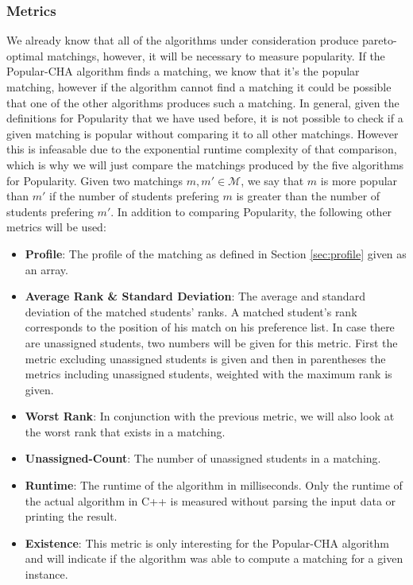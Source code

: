 \subsubsection{Metrics}
We already know that all of the algorithms under consideration produce pareto-optimal matchings, however, it will be necessary to measure popularity. If the Popular-CHA algorithm finds a matching, we know that it's the popular matching, however if the algorithm cannot find a matching it could be possible that one of the other algorithms produces such a matching. In general, given the definitions for Popularity that we have used before, it is not possible to check if a given matching is popular without comparing it to all other matchings. However this is infeasable due to the exponential runtime complexity of that comparison, which is why we will just compare the matchings produced by the five algorithms for Popularity. Given two matchings $m, m' \in \mathcal{M}$, we say that $m$ is more popular than $m'$ if the number of students prefering $m$ is greater than the number of students prefering $m'$. 
In addition to comparing Popularity, the following other metrics will be used:
\begin{itemize}
  \item \textbf{Profile}: The profile of the matching as defined in Section \ref{sec:profile} given as an array.
  \item \textbf{Average Rank \& Standard Deviation}: The average and standard deviation of the matched students' ranks. A matched student's rank corresponds to the position of his match on his preference list. In case there are unassigned students, two numbers will be given for this metric. First the metric excluding unassigned students is given and then in parentheses the metrics including unassigned students, weighted with the maximum rank is given.
  \item \textbf{Worst Rank}: In conjunction with the previous metric, we will also look at the worst rank that exists in a matching.
  \item \textbf{Unassigned-Count}: The number of unassigned students in a matching.
  \item \textbf{Runtime}: The runtime of the algorithm in milliseconds. Only the runtime of the actual algorithm in C++ is measured without parsing the input data or printing the result.
  \item \textbf{Existence}: This metric is only interesting for the Popular-CHA algorithm and will indicate if the algorithm was able to compute a matching for a given instance.
\end{itemize}

